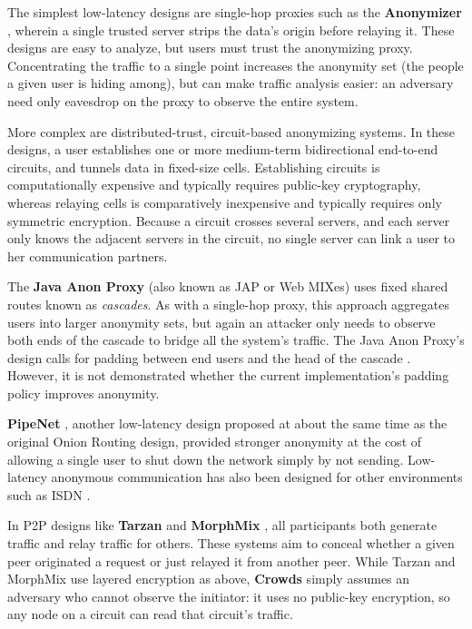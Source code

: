 \documentclass[times,10pt,twocolumn]{article}
\begin{document}
The simplest low-latency designs are single-hop proxies such as the
{\bf Anonymizer} \cite{anonymizer}, wherein a single trusted server strips the
data's origin before relaying it.  These designs are easy to
analyze, but users must trust the anonymizing proxy. 
Concentrating the traffic to a single point increases the anonymity set
(the people a given user is hiding among), but can make traffic
analysis easier: an adversary need only eavesdrop on the proxy to observe
the entire system.

More complex are distributed-trust, circuit-based anonymizing systems.
In these designs, a user establishes one or more medium-term bidirectional
end-to-end circuits, and tunnels data in fixed-size cells.
Establishing circuits is computationally expensive and typically
requires public-key
cryptography, whereas relaying cells is comparatively inexpensive and
typically requires only symmetric encryption.
Because a circuit crosses several servers, and each server only knows
the adjacent servers in the circuit, no single server can link a
user to her communication partners.

The {\bf Java Anon Proxy} (also known as JAP or Web MIXes) uses fixed shared
routes known as \emph{cascades}.  As with a single-hop proxy, this
approach aggregates users into larger anonymity sets, but again an
attacker only needs to observe both ends of the cascade to bridge all
the system's traffic.  The Java Anon Proxy's design 
calls for padding between end users and the head of the cascade
\cite{web-mix}. However, it is not demonstrated whether the current
implementation's padding policy improves anonymity.

{\bf PipeNet} \cite{back01, pipenet}, another low-latency design proposed at
about the same time as the original Onion Routing design, provided
stronger anonymity at the cost of allowing a single user to shut
down the network simply by not sending.  Low-latency anonymous
communication has also been designed for other environments such as
ISDN \cite{isdn-mixes}.

In P2P designs like {\bf Tarzan} \cite{tarzan:ccs02} and {\bf MorphMix}
\cite{morphmix:fc04}, all participants both generate traffic and relay
traffic for others. These systems aim to conceal
whether a given peer originated a request
or just relayed it from another peer. While Tarzan and MorphMix use
layered encryption as above, {\bf Crowds} \cite{crowds-tissec} simply assumes
an adversary who cannot observe the initiator: it uses no public-key
encryption, so any node on a circuit can read that circuit's traffic.
\end{document}
